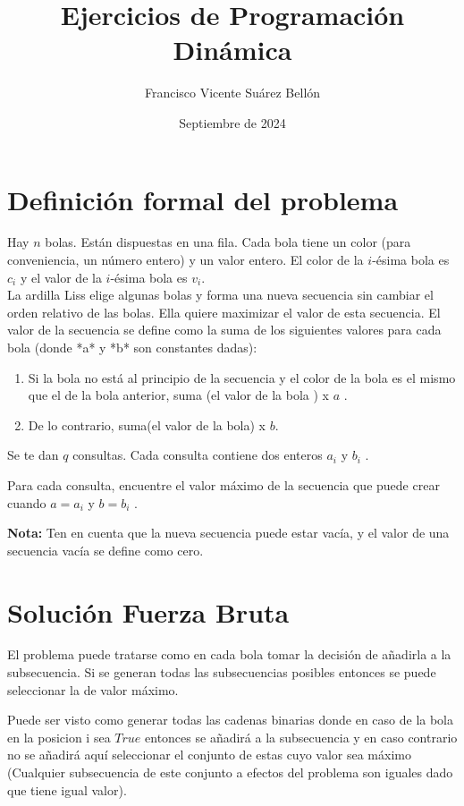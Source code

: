 \documentclass{article}
\title{Ejercicios de Programación Dinámica}
\author{Francisco Vicente Suárez Bellón}
\date{Septiembre de 2024}
\begin{document}
\maketitle
\newpage
\tableofcontents %
\newpage
\section{Definición formal del problema}
Hay $n$ bolas. Están dispuestas en una fila. Cada bola tiene un color (para conveniencia, un número entero) y un valor entero. El color de la $i$-ésima
bola es $c_i$ y el valor de la $i$-ésima bola es $v_i$.\\
La ardilla Liss elige algunas bolas y forma una nueva secuencia sin cambiar el orden relativo de las bolas. Ella quiere maximizar el valor de esta secuencia.
El valor de la secuencia se define como la suma de los siguientes valores para cada bola (donde *a* y *b* son constantes dadas): 
\begin{enumerate}
    \item Si la bola no está al principio de la secuencia y el color de la bola es el mismo que el de la bola anterior, suma (el valor de la bola ) x $a$ .
    \item De lo contrario, suma(el valor de la bola) x $b$.
\end{enumerate}


Se te dan $q$ consultas. Cada consulta contiene dos enteros $a_i$ y $b_i$ .

Para cada consulta, encuentre el valor máximo de la secuencia que puede crear cuando $a=a_i$ y $b=b_i$ .

\textbf{Nota:} Ten en cuenta que la nueva secuencia puede estar vacía, y el valor de una secuencia vacía se define como cero.


\pagebreak

\section{Solución Fuerza Bruta}
El problema puede tratarse como en cada bola tomar la decisión de añadirla a la subsecuencia. Si se generan todas las subsecuencias posibles entonces
se puede seleccionar la de valor máximo.

Puede ser visto como generar todas las cadenas binarias donde en caso de la bola en la posicion i sea $True$ entonces se añadirá a la subsecuencia y en caso contrario no se añadirá
aquí seleccionar el conjunto de estas cuyo valor sea máximo (Cualquier subsecuencia de este conjunto a efectos del problema son iguales dado que tiene igual valor).
\end{document}
